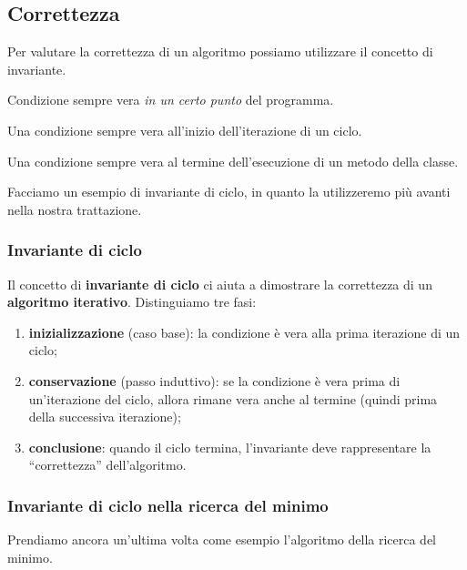 \subsection{Correttezza}

Per valutare la correttezza di un algoritmo possiamo utilizzare il concetto di invariante.

\begin{definition}[invariante]
Condizione sempre vera \emph{in un certo punto} del programma.
\end{definition}

\begin{definition}
Una condizione sempre vera all'inizio dell'iterazione di un ciclo.
\end{definition}

\begin{definition}
Una condizione sempre vera al termine dell'esecuzione di un metodo della classe.
\end{definition}

Facciamo un esempio di invariante di ciclo, in quanto la utilizzeremo più avanti nella nostra trattazione.

\subsubsection{Invariante di ciclo}

Il concetto di \textbf{invariante di ciclo} ci aiuta a dimostrare la correttezza di un \textbf{algoritmo iterativo}.
Distinguiamo tre fasi:
\begin{enumerate}
	\item \textbf{inizializzazione} (caso base): la condizione è vera alla prima iterazione di un ciclo;
	\item \textbf{conservazione} (passo induttivo): se la condizione è vera prima di un'iterazione del ciclo, allora rimane vera anche al termine (quindi prima della successiva iterazione);
	\item \textbf{conclusione}: quando il ciclo termina, l'invariante deve rappresentare la \enquote{correttezza} dell'algoritmo.
\end{enumerate}

\subsubsection{Invariante di ciclo nella ricerca del minimo}

Prendiamo ancora un'ultima volta come esempio l'algoritmo della ricerca del minimo.

